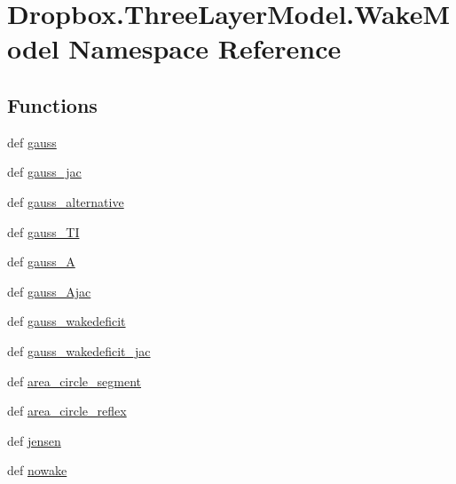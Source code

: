 \hypertarget{namespaceDropbox_1_1ThreeLayerModel_1_1WakeModel}{\section{Dropbox.\+Three\+Layer\+Model.\+Wake\+Model Namespace Reference}
\label{namespaceDropbox_1_1ThreeLayerModel_1_1WakeModel}
}
\subsection*{Functions}
\begin{DoxyCompactItemize}
\item 
def \hyperlink{namespaceDropbox_1_1ThreeLayerModel_1_1WakeModel_a2cea82aecffed3a234d3aafabc05c31f}{gauss}
\item 
def \hyperlink{namespaceDropbox_1_1ThreeLayerModel_1_1WakeModel_aed3511e0663f179cf7848f70dc8c9312}{gauss\+\_\+jac}
\item 
def \hyperlink{namespaceDropbox_1_1ThreeLayerModel_1_1WakeModel_aa9406c616c48474e58d5a583d4ab3167}{gauss\+\_\+alternative}
\item 
def \hyperlink{namespaceDropbox_1_1ThreeLayerModel_1_1WakeModel_a61e76f85f24fdec2d5e83d147c6e3455}{gauss\+\_\+\+T\+I}
\item 
def \hyperlink{namespaceDropbox_1_1ThreeLayerModel_1_1WakeModel_af91ea7cd4fa6f90fbd3dbde29dfb7ca2}{gauss\+\_\+\+A}
\item 
def \hyperlink{namespaceDropbox_1_1ThreeLayerModel_1_1WakeModel_a5a9c5f46d1c9580c4fd2715f4b7e1b58}{gauss\+\_\+\+Ajac}
\item 
def \hyperlink{namespaceDropbox_1_1ThreeLayerModel_1_1WakeModel_a5d75d6cb8b0099ceebc5198aeade0c41}{gauss\+\_\+wakedeficit}
\item 
def \hyperlink{namespaceDropbox_1_1ThreeLayerModel_1_1WakeModel_aaf78a42296d7d8ddbba6d7eb3685cad6}{gauss\+\_\+wakedeficit\+\_\+jac}
\item 
def \hyperlink{namespaceDropbox_1_1ThreeLayerModel_1_1WakeModel_a8c18d8c3efebb3b8899b53a46dd47277}{area\+\_\+circle\+\_\+segment}
\item 
def \hyperlink{namespaceDropbox_1_1ThreeLayerModel_1_1WakeModel_afe0f35697a50fe77f4250d4bf143b65c}{area\+\_\+circle\+\_\+reflex}
\item 
def \hyperlink{namespaceDropbox_1_1ThreeLayerModel_1_1WakeModel_a33c75bc026c9ab9a69a57ca3abd5baf6}{jensen}
\item 
def \hyperlink{namespaceDropbox_1_1ThreeLayerModel_1_1WakeModel_af417117812345db43c1c4080f5c8f06d}{nowake}

\end{DoxyCompactItemize}
